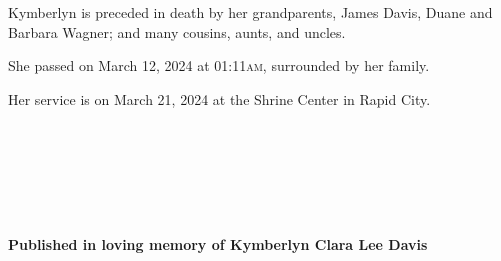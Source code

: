 \documentclass[10pt]{report}
\newcommand{\fbd}{
    \setlength{\fboxsep}{0pt}
    \setlength{\fboxrule}{3pt}
  }
\begin{document}
Kymberlyn is preceded in death by her grandparents, James Davis, 
Duane and Barbara Wagner; and many cousins, aunts, and uncles. 

She passed on March 12, 2024 at 01:11\textsc{am}, surrounded by her family.

Her service is on March 21, 2024 at the Shrine Center in Rapid City.
\clearpage


\begin{center}
  \;\\
  \;\\
  \;\\
  \;\\
  \;\\
  {\fbd
    }

  \textbf{Published in loving memory of Kymberlyn Clara Lee Davis}
\end{center}
\end{document}
